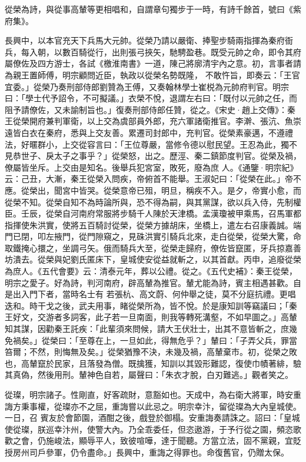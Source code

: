 \begin{pinyinscope}
 從榮為詩，與從事高輦等更相唱和，自謂章句獨步于一時，有詩千餘首，號曰《紫府集》。



 長興中，以本官充天下兵馬大元帥。從榮乃請以嚴衛、捧聖步騎兩指揮為秦府衙兵，每入朝，以數百騎從行，出則張弓挾矢，馳騁盈巷。既受元帥之命，即令其府屬僚佐及四方游士，各試《檄淮南書》一道，陳己將廓清宇內之意。初，言事者請為親王置師傅，明宗顧問近臣，執政以從榮名勢既隆，
 不敢忤旨，即奏云：「王官宜委。」從榮乃奏刑部侍郎劉贊為王傅，又奏翰林學士崔棁為元帥府判官。明宗曰：「學士代予詔令，不可擬議。」衣榮不悅，退謂左右曰：「既付以元帥之任，而阻予請僚佐，又未諭制旨也。」復奏刑部侍郎任贊，從之。《宋史·趙上交傳》：秦王從榮開府兼判軍衛，以上交為虞部員外郎，充六軍諸衛推官。李澣、張沆、魚崇遠皆白衣在秦府，悉與上交友善。累遷司封郎中，充判官。從榮素豪邁，不遵禮法，好暱群小，上交從容言曰：「王位尊嚴，當修令德以慰民望。王忍為此，獨不見恭世子、戾太子之事乎？」從榮怒，出之。歷涇、秦二鎮節度判官。從榮及禍，僚屬皆坐斥。上交由是知名。後舉兵犯宮室，敗死，廢為庶
 人。《通鑒·明宗紀》云：己丑，大漸，秦王從榮入問疾，帝俯首不能舉。王淑妃曰：「從榮在此。」帝不應。從榮出，聞宮中皆哭。從榮意帝已殂，明旦，稱疾不入。是夕，帝實小愈，而從榮不知。從榮自知不為時論所與，恐不得為嗣，與其黨謀，欲以兵入侍，先制權臣。壬辰，從榮自河南府常服將步騎千人陳於天津橋。孟漢瓊被甲乘馬，召馬軍都指揮使朱洪實，使將五百騎討從榮，從榮方據胡床，坐橋上，遣左右召康義誠。端門已閉，叩左掖門，從門隙窺之，見硃洪實引騎兵北來，走白從榮，從榮大驚，命取鐵掩心擐之，坐調弓矢。俄而騎兵大至，從榮走歸府，僚佐皆竄匿，牙兵掠嘉善坊潰去。從榮與妃劉氏匿床下，皇城使安從益就斬之，以其首獻。丙申，追廢從榮為庶人。《五代會要》云：清泰元年，葬以公禮。從之。《五代史補》：秦王從榮，明宗之愛子。好為詩，判河南府，辟高輦為推官。輦尤能為詩，賓主相遇甚歡。自是出入門下者，當時名士有
 若張杭、高文蔚、何仲舉之徒，莫不分庭抗禮。更唱迭和。時干戈之後，武夫用事，睹從榮所為，皆不悅。於是康知訓等竊議曰；「秦王好文，交游者多詞客，此子若一旦南面，則我等轉死溝壑，不如早圖之。」高輦知其謀，因勸秦王託疾：「此輩須來問候，請大王伏壯士，出其不意皆斬之，庶幾免禍矣。」從榮曰：「至尊在上，一旦如此，得無危乎？」輦曰：「子弄父兵，罪當笞爾；不然，則悔無及矣。」從榮猶豫不決，未幾及禍，高輦棄市。初，從榮之敗也，高輦竄於民家，且落發為僧。既擒獲，知訓以其毀形難認，復使巾幘著緋，驗其真偽，然後用刑。輦神色自若，屬聲曰：「朱衣才脫，白刃難逃。」觀者笑之。



 從璨，明宗諸子。性剛直，好客疏財，意豁如也。天成中，為右衛大將軍，時安重誨方秉事權，從璨亦不之屈，重誨嘗以此忌之。明宗幸汴，留從璨為大內皇城使。一日，召
 賓友於會節園，酒酣之後，戲登於御榻。安重誨奏請誅之。詔曰：「皇城使從璨，朕巡幸汴州，使警大內。乃全乖委任，但恣遨游，于予行從之園，頻恣歌歡之會，仍施峻法，顯辱平人，致彼喧嘩，達于聞聽。方當立法，固不黨親，宜貶授房州司戶參軍，仍令盡命。」長興中，重誨之得罪也。命復舊官，仍贈太保。




\end{pinyinscope}
